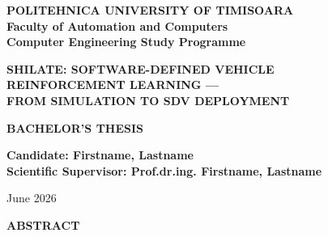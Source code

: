 \documentclass[12pt,a4paper]{article}
\title{}
\author{}
\date{}
\begin{document}
\pagestyle{empty}

\begin{titlepage}
  \centering
  \vspace*{2cm}

  {\fontsize{10}{13}\selectfont
    \textbf{POLITEHNICA UNIVERSITY OF TIMISOARA}\\[0.3cm]
    \textbf{Faculty of Automation and Computers}\\[0.3cm]
    \textbf{Computer Engineering Study Programme}
  }

  \vspace{2.5cm}

  {\fontsize{20}{26}\selectfont\bfseries\MakeUppercase{%
    SHILATE: Software-Defined Vehicle\\[0.4cm]
    Reinforcement Learning ---\\[0.4cm]
    From Simulation to SDV Deployment%
  }\par}

  \vspace{1.5cm}

  {\fontsize{14}{18}\selectfont
    \textbf{BACHELOR'S THESIS}
  }

  \vspace{3cm}

  \begin{flushleft}
    {\fontsize{14}{18}\selectfont
      \textbf{Candidate: Firstname, Lastname}\\[0.8cm]
      \textbf{Scientific Supervisor: Prof.dr.ing. Firstname, Lastname}
    }
  \end{flushleft}

  \vfill

  {\fontsize{14}{18}\selectfont June 2026}
\end{titlepage}

\clearpage

\vspace*{3\baselineskip}

\begin{center}
  {\fontsize{20}{26}\selectfont\bfseries ABSTRACT}
\end{center}

\vspace{2\baselineskip}
\end{document}
